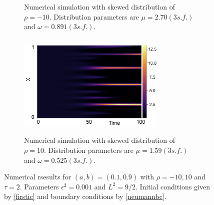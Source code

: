 \begin{figure}[H]
\begin{subfigure}[t]{0.45\textwidth}
        \caption{Numerical simulation with skewed distribution of $\rho=-10$. Distribution parameters are $\mu=2.70(3 s.f.)$ and $\omega=0.891(3 s.f.)$.}
        \label{}
    \end{subfigure}
    \hfill
    \begin{subfigure}[t]{0.45\textwidth}
        \centering
        \includegraphics[width=7cm,height=5cm]{fixt1.png}
        \caption{Numerical simulation with skewed distribution of $\rho=10$. Distribution parameters are $\mu=1.59(3 s.f.)$ and $\omega=0.525(3 s.f.)$.}
        \label{}
    \end{subfigure}
    \caption{Numerical rsesults for $(a,b)=(0.1,0.9)$ with $\rho=-10,10$ and $\tau=2$. Parameters $\epsilon^2=0.001$ and $L^2=9/2$. Initial conditions given by \eqref{firstic} and boundary conditions by \eqref{neumannbc}.}
    \label{fig:linskew2}
\end{figure}

